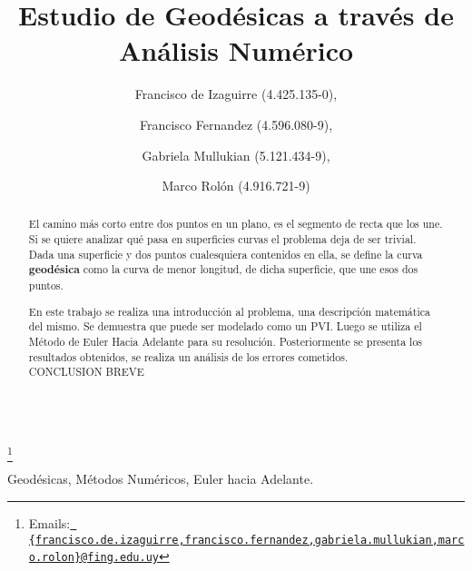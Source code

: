 \documentclass{endm}
\begin{document}
\begin{verbatim}\end{verbatim}\vspace{2.5cm}

\begin{frontmatter}

\title{Estudio de Geod\'esicas a trav\'es de An\'alisis Num\'erico}

\author{Francisco de Izaguirre (4.425.135-0),}
\author{Francisco Fernandez (4.596.080-9),}
\author{Gabriela Mullukian (5.121.434-9),}
\author{Marco Rol\'on (4.916.721-9)}

\address{Instituto de Matem\'atica y Estad\'istica\\ Facultad de Ingenier\'ia. Universidad de la Rep\'ublica\\ Montevideo, Uruguay}

\thanks[mails]{Emails:\href{} {\texttt{\normalshape
   \{francisco.de.izaguirre,francisco.fernandez,gabriela.mullukian,marco.rolon\}@fing.edu.uy}}}

\begin{abstract}
El camino m\'as corto entre dos puntos en un plano, es el segmento de recta que los une. Si se quiere analizar qu\'e pasa en superficies curvas el problema deja de ser trivial. Dada una superficie y dos puntos cualesquiera contenidos en ella, se define la curva \textbf{geod\'esica} como la curva de menor longitud, de dicha superficie, que une esos dos puntos.
    
En este trabajo se realiza una introducci\'on al problema, una descripci\'on matem\'atica del mismo. Se demuestra que puede ser modelado como un PVI. Luego se utiliza el M\'etodo de Euler Hacia Adelante para su resoluci\'on. 
Posteriormente se presenta los resultados obtenidos, se realiza un an\'alisis de los errores cometidos. \\ CONCLUSION BREVE
     
\end{abstract}
\begin{keyword}
Geod\'esicas, M\'etodos Num\'ericos, Euler hacia Adelante.
\end{keyword}

\end{frontmatter}
\newpage
\end{document}
